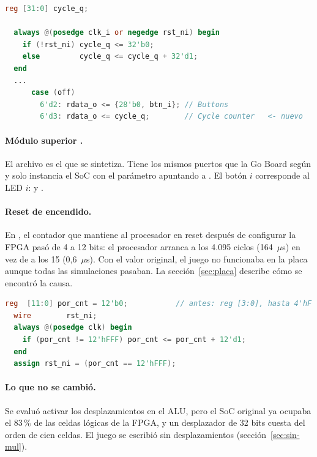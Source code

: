 \begin{lstlisting}[language=Verilog, caption={Contador de ciclos agregado a \code{pochoco\_periph.v}.}, label={lst:contador}]
  reg [31:0] cycle_q;

  always @(posedge clk_i or negedge rst_ni) begin
    if (!rst_ni) cycle_q <= 32'b0;
    else         cycle_q <= cycle_q + 32'd1;
  end
  ...
      case (off)
        6'd2: rdata_o <= {28'b0, btn_i}; // Buttons
        6'd3: rdata_o <= cycle_q;        // Cycle counter   <- nuevo
\end{lstlisting}

\paragraph{Módulo superior .} El archivo  es el
que se sintetiza. Tiene los mismos puertos que la Go Board según  y
solo instancia el SoC con el parámetro  apuntando a .
El botón $i$ corresponde al LED $i$:  y .

\paragraph{Reset de encendido.} En , el contador que mantiene
al procesador en reset después de configurar la FPGA pasó de 4 a 12 bits: el procesador
arranca a los 4.095 ciclos (164~$\mu$s) en vez de a los 15 (0,6~$\mu$s). Con el valor
original, el juego no funcionaba en la placa aunque todas las simulaciones pasaban. La
sección~\ref{sec:placa} describe cómo se encontró la causa.

\begin{lstlisting}[language=Verilog, caption={Reset de encendido en \code{pochoco\_soc.v}, con el contador ampliado.}, label={lst:por}]
  reg  [11:0] por_cnt = 12'b0;           // antes: reg [3:0], hasta 4'hF
  wire        rst_ni;
  always @(posedge clk) begin
    if (por_cnt != 12'hFFF) por_cnt <= por_cnt + 12'd1;
  end
  assign rst_ni = (por_cnt == 12'hFFF);
\end{lstlisting}

\paragraph{Lo que no se cambió.} Se evaluó activar los desplazamientos en el ALU, pero
el SoC original ya ocupaba el 83\,\% de las celdas lógicas de la FPGA, y un
desplazador de 32 bits cuesta del orden de cien celdas. El juego se escribió sin
desplazamientos (sección~\ref{sec:sin-mul}).

